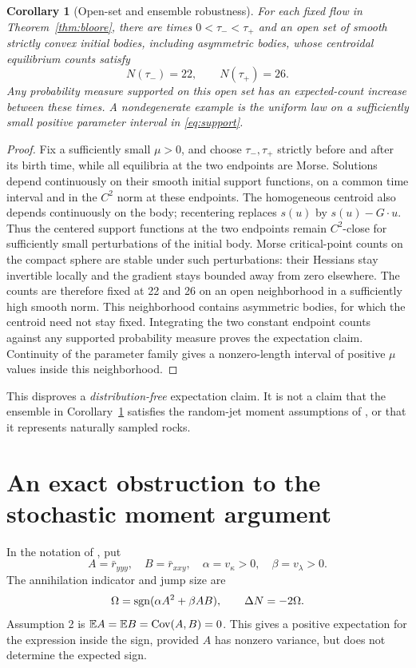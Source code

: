 \documentclass[11pt,a4paper]{article}
\newtheorem{corollary}[theorem]{Corollary}
\theoremstyle{remark}\newtheorem{remark}[theorem]{Remark}
\begin{document}
\begin{corollary}[Open-set and ensemble robustness]\label{cor:robust}
For each fixed flow in Theorem~\ref{thm:bloore}, there are times \(0<\tau_-<\tau_+\) and an open set of smooth strictly convex initial bodies, including asymmetric bodies, whose centroidal equilibrium counts satisfy
\[
 N(\tau_-)=22,\qquad N(\tau_+)=26.
\]
Any probability measure supported on this open set has an expected-count increase between these times. A nondegenerate example is the uniform law on a sufficiently small positive parameter interval in \eqref{eq:support}.
\end{corollary}
\begin{proof}
Fix a sufficiently small \(\mu>0\), and choose \(\tau_-,\tau_+\) strictly before and after its birth time, while all equilibria at the two endpoints are Morse. Solutions depend continuously on their smooth initial support functions, on a common time interval and in the \(C^2\) norm at these endpoints. The homogeneous centroid also depends continuously on the body; recentering replaces \(s(u)\) by \(s(u)-G\cdot u\). Thus the centered support functions at the two endpoints remain \(C^2\)-close for sufficiently small perturbations of the initial body. Morse critical-point counts on the compact sphere are stable under such perturbations: their Hessians stay invertible locally and the gradient stays bounded away from zero elsewhere. The counts are therefore fixed at 22 and 26 on an open neighborhood in a sufficiently high smooth norm. This neighborhood contains asymmetric bodies, for which the centroid need not stay fixed. Integrating the two constant endpoint counts against any supported probability measure proves the expectation claim. Continuity of the parameter family gives a nonzero-length interval of positive \(\mu\) values inside this neighborhood.
\end{proof}

This disproves a \emph{distribution-free} expectation claim. It is not a claim that the ensemble in Corollary~\ref{cor:robust} satisfies the random-jet moment assumptions of \citet{D15}, or that it represents naturally sampled rocks.

\section{An exact obstruction to the stochastic moment argument}\label{sec:probability}
In the notation of \citet[equations (49)--(53)]{D15}, put
\[
 A=\bar r_{yyy},\quad B=\bar r_{xxy},\quad
 \alpha=v_\kappa>0,\quad\beta=v_\lambda>0.
\]
The annihilation indicator and jump size are
\begin{equation}\label{eq:sign}
 \Omega=\operatorname{sgn}(\alpha A^2+\beta AB),\qquad \Delta N=-2\Omega.
\end{equation}
Assumption 2 is \(\mathbb E A=\mathbb E B=\operatorname{Cov}(A,B)=0\). This gives a positive expectation for the expression inside the sign, provided \(A\) has nonzero variance, but does not determine the expected sign.
\end{document}

